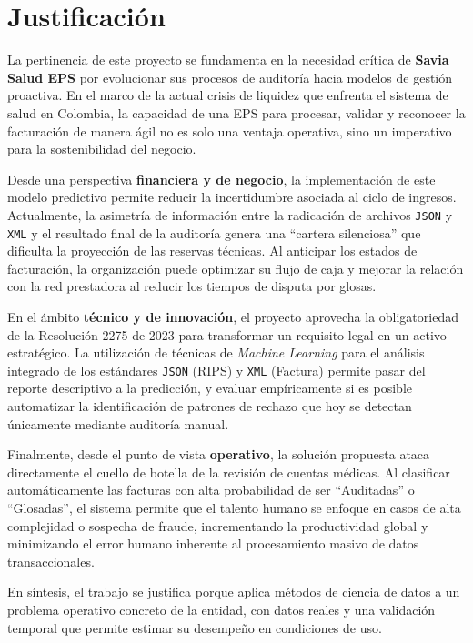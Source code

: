 \documentclass[12pt,letterpaper]{report}
\begin{document}
\chapter{Justificación}
La pertinencia de este proyecto se fundamenta en la necesidad crítica de \textbf{Savia Salud EPS} por evolucionar sus procesos de auditoría hacia modelos de gestión proactiva. En el marco de la actual crisis de liquidez que enfrenta el sistema de salud en Colombia, la capacidad de una EPS para procesar, validar y reconocer la facturación de manera ágil no es solo una ventaja operativa, sino un imperativo para la sostenibilidad del negocio.

Desde una perspectiva \textbf{financiera y de negocio}, la implementación de este modelo predictivo permite reducir la incertidumbre asociada al ciclo de ingresos. Actualmente, la asimetría de información entre la radicación de archivos \texttt{JSON} y \texttt{XML} y el resultado final de la auditoría genera una ``cartera silenciosa'' que dificulta la proyección de las reservas técnicas. Al anticipar los estados de facturación, la organización puede optimizar su flujo de caja y mejorar la relación con la red prestadora al reducir los tiempos de disputa por glosas.

En el ámbito \textbf{técnico y de innovación}, el proyecto aprovecha la obligatoriedad de la Resolución 2275 de 2023 para transformar un requisito legal en un activo estratégico. La utilización de técnicas de \textit{Machine Learning} para el análisis integrado de los estándares \texttt{JSON} (RIPS) y \texttt{XML} (Factura) permite pasar del reporte descriptivo a la predicción, y evaluar empíricamente si es posible automatizar la identificación de patrones de rechazo que hoy se detectan únicamente mediante auditoría manual.

Finalmente, desde el punto de vista \textbf{operativo}, la solución propuesta ataca directamente el cuello de botella de la revisión de cuentas médicas. Al clasificar automáticamente las facturas con alta probabilidad de ser ``Auditadas'' o ``Glosadas'', el sistema permite que el talento humano se enfoque en casos de alta complejidad o sospecha de fraude, incrementando la productividad global y minimizando el error humano inherente al procesamiento masivo de datos transaccionales.

En síntesis, el trabajo se justifica porque aplica métodos de ciencia de datos a un problema operativo concreto de la entidad, con datos reales y una validación temporal que permite estimar su desempeño en condiciones de uso.
\end{document}
